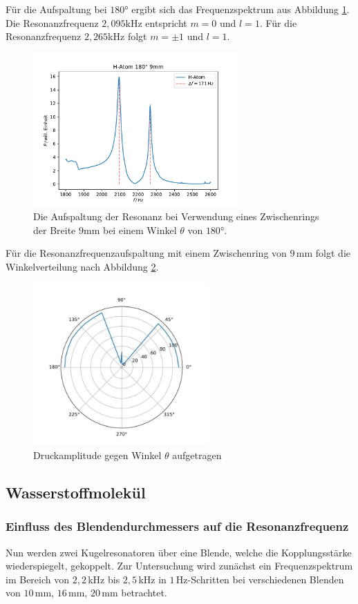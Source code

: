 Für die Aufspaltung bei $180°$ ergibt sich das Frequenzspektrum aus Abbildung \ref{fig:9mm_res}.
Die Resonanzfrequenz $2,095$kHz entspricht $m=0$ und $l=1$. Für die Resonanzfrequenz $2,265$kHz folgt $m=\pm 1$ und $l=1$.
\begin{figure}[H]
    \center
    \includegraphics[width=0.7\textwidth]{plots/Hatom/zustandsaufspaltung_9.pdf}
    \caption{Die Aufspaltung der Resonanz bei Verwendung eines Zwischenrings der Breite $9$mm bei einem Winkel $\theta$ von $180°$.}
    \label{fig:9mm_res}
\end{figure}
Für die Resonanzfrequenzaufspaltung mit einem Zwischenring von $9\,$mm folgt die Winkelverteilung nach Abbildung \ref{fig:9mm_winkel}.
\begin{figure}
    \center
    \includegraphics[width=0.6\textwidth]{9mm_winkel.jpg}
    \caption{Druckamplitude gegen Winkel $\theta$ aufgetragen}
    \label{fig:9mm_winkel}
\end{figure}
\newpage
\subsection{Wasserstoffmolekül}
\subsubsection*{Einfluss des Blendendurchmessers auf die Resonanzfrequenz}
Nun werden zwei Kugelresonatoren über eine Blende, welche die Kopplungsstärke wiederspiegelt, gekoppelt.
Zur Untersuchung wird zunächst ein Frequenzspektrum im Bereich von $2,2\,$kHz bis $2,5\,$kHz in $1\,$Hz-Schritten bei verschiedenen
Blenden von $10\,$mm, $16\,$mm, $20\,$mm betrachtet.\\


